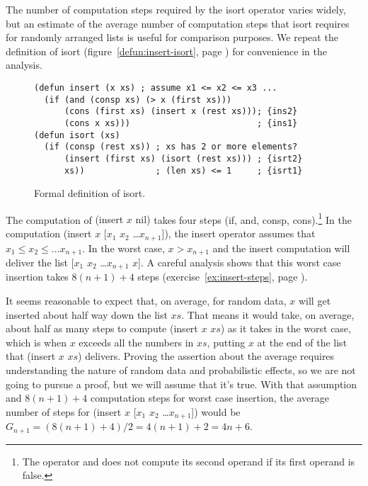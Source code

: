 The number of computation steps required by the
\textsf{isort} operator
varies widely, but
an estimate of the average number of computation steps that
\textsf{isort} requires for randomly arranged lists
is useful for comparison purposes.
We repeat the definition of \textsf{isort}
(figure~\ref{defun:insert-isort}, page \pageref{defun:insert-isort})
for convenience in the analysis.

\begin{figure}
\begin{code}
\begin{verbatim}
(defun insert (x xs) ; assume x1 <= x2 <= x3 ...
  (if (and (consp xs) (> x (first xs)))
      (cons (first xs) (insert x (rest xs))); {ins2}
      (cons x xs)))                         ; {ins1}
(defun isort (xs)
  (if (consp (rest xs)) ; xs has 2 or more elements?
      (insert (first xs) (isort (rest xs))) ; {isrt2}
      xs))              ; (len xs) <= 1     ; {isrt1}
\end{verbatim}
\end{code}
\caption{Formal definition of \textsf{isort}.}
\label{defun:insert-isort}\label{defun:isort-copy}
\end{figure}

The computation of \textsf{(insert $x$ nil)}
takes four steps
(\textsf{if}, \textsf{and}, \textsf{consp},
\textsf{cons}).\footnote{The operator \textsf{and}
does not compute its second operand if its first operand
is false.}
In the computation \textsf{(insert $x$ [$x_1$ $x_2$ \dots $x_{n+1}$])},
the \textsf{insert} operator assumes that
$x_1 \leq x_2 \leq \dots x_{n+1}$.
In the worst case, $x > x_{n+1}$ and the \textsf{insert} computation
will deliver the list [$x_1$ $x_2$ \dots $x_{n+1}$ $x$].
A careful analysis shows that this worst case insertion takes
$8(n+1)+4$ steps (exercise~\ref{ex:insert-steps}, page \pageref{ex:insert-steps}).

It seems reasonable to expect that, on average,
for random data, $x$ will get inserted about
half way down the list $xs$.
That means it would take, on average, about
half as many steps to compute \textsf{(insert $x$ $xs$)}
as it takes in the worst case,
which is when $x$ exceeds all the numbers
in $xs$, putting $x$ at the end of the
list that \textsf{(insert $x$ $xs$)} delivers.
Proving the assertion about the average
requires understanding the nature of random
data and probabilistic effects, so we are not going
to pursue a proof, but we will assume that it's true.
With that assumption and $8(n+1)+4$
computation steps for worst case insertion,
the average number of steps
for \textsf{(insert $x$ [$x_1$ $x_2$ \dots $x_{n+1}$])} would be
$G_{n+1} = (8(n+1)+4)/2 = 4(n+1)+2 = 4n+6$.

